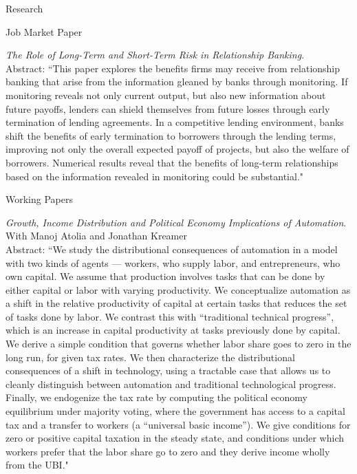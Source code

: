 \documentclass{resume} %
\begin{document}
\begin{rSection}{Research}
	    \begin{rSubsection}{Job Market Paper}{}{}{}
		\item \emph{The Role of Long-Term and Short-Term Risk in Relationship Banking}.\\
		Abstract: ``This paper explores the benefits firms may receive from relationship banking that arise from the information gleaned by banks through monitoring. If monitoring reveals not only current output, but also new information about future payoffs, lenders can shield themselves from future losses through early termination of lending agreements. In a competitive lending environment, banks shift the benefits of early termination to borrowers through the lending terms, improving not only the overall expected payoff of projects, but also the welfare of borrowers. Numerical results reveal that the benefits of long-term relationships based on the information revealed in monitoring could be substantial."
		\end{rSubsection}
	
		\begin{rSubsection}{Working Papers}{}{}{}

		\item \emph{Growth, Income Distribution and Political Economy Implications of Automation}. With Manoj Atolia and Jonathan Kreamer\\
		Abstract: ``We study the distributional consequences of automation in a model with two kinds of agents --- workers, who supply labor, and entrepreneurs, who own capital. We assume that production involves tasks that can be done by either capital or labor with varying productivity. We conceptualize automation as a shift in the relative productivity of capital at certain tasks that reduces the set of tasks done by labor. We contrast this with ``traditional technical progress'', which is an increase in capital productivity at tasks previously done by capital. We derive a simple condition that governs whether labor share goes to zero in the long run, for given tax rates. We then characterize the distributional consequences of a shift in technology, using a tractable case that allows us to cleanly distinguish between automation and traditional technological progress. Finally, we endogenize the tax rate by computing the political economy equilibrium under majority voting, where the government has access to a capital tax and a transfer to workers (a ``universal basic income''). We give conditions for zero or positive capital taxation in the steady state, and conditions under which workers prefer that the labor share go to zero and they derive income wholly from the UBI." \\
	\end{rSubsection}
	

\end{rSection}
\end{document}
